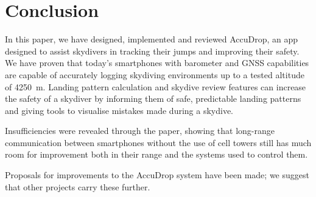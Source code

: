 \section{Conclusion}\label{sec:conclusion}

In this paper, we have designed, implemented and reviewed AccuDrop, an app designed to assist skydivers in tracking their jumps and improving their safety. We have proven that today's smartphones with barometer and GNSS capabilities are capable of accurately logging skydiving environments up to a tested altitude of \SI{4250}{\metre}. Landing pattern calculation and skydive review features can increase the safety of a skydiver by informing them of safe, predictable landing patterns and giving tools to visualise mistakes made during a skydive.

Insufficiencies were revealed through the paper, showing that long-range communication between smartphones without the use of cell towers still has much room for improvement both in their range and the systems used to control them.

Proposals for improvements to the AccuDrop system have been made; we suggest that other projects carry these further.
